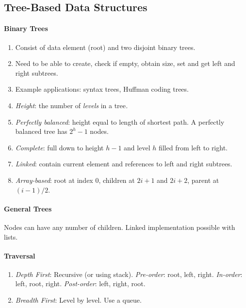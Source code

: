 \documentclass[twocolumn,english]{article}
\begin{document}
\subsection{Tree-Based Data Structures}


\paragraph{Binary Trees}
\begin{enumerate}
\item Consist of data element (root) and two disjoint binary trees.
\item Need to be able to create, check if empty, obtain size, set and get
left and right subtrees.
\item Example applications: syntax trees, Huffman coding trees.
\item \emph{Height}: the number of \emph{levels} in a tree\emph{.}
\item \emph{Perfectly balanced}: height equal to length of shortest path.
A perfectly balanced tree has $2^{h}-1$ nodes.
\item \emph{Complete}: full down to height $h-1$ and level $h$ filled
from left to right.
\item \emph{Linked}: contain current element and references to left and
right subtrees.
\item \emph{Array-based}: root at index 0, children at $2i+1$ and $2i+2$,
parent at $(i-1)/2$.
\end{enumerate}

\paragraph{General Trees}

Nodes can have any number of children. Linked implementation possible
with lists.


\paragraph{Traversal}
\begin{enumerate}
\item \emph{Depth First}: Recursive (or using stack).\emph{ Pre-order}:
root, left, right. \emph{In-order}: left, root, right. \emph{Post-order}:
left, right, root.
\item \emph{Breadth First}: Level by level. Use a queue.
\end{enumerate}
\end{document}
